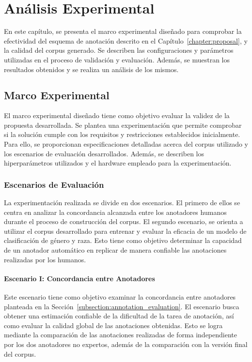 \chapter{An\'alisis Experimental}\label{chapter:implementation}
En este cap\'itulo, se presenta el marco experimental dise\~nado para comprobar la efectividad del esquema de anotaci\'on 
descrito en el Cap\'itulo~\ref{chapter:proposal}, y la calidad del corpus generado. Se describen las configuraciones y 
par\'ametros utilizadas en el proceso de validaci\'on y evaluaci\'on. Adem\'as, se muestran los resultados obtenidos y 
se realiza un an\'alisis de los mismos.

\section{Marco Experimental}\label{section:experimental_framework}
El marco experimental dise\~nado tiene como objetivo evaluar la validez de la propuesta desarrollada. Se plantea 
una experimentaci\'on que permite comprobar si la soluci\'on cumple con los requisitos y restricciones establecidos inicialmente.
Para ello, se proporcionan especificaciones detalladas acerca del corpus utilizado y los escenarios de evaluaci\'on desarrollados.
Adem\'as, se describen los hiperpar\'ametros utilizados y el hardware empleado para la experimentaci\'on.

\subsection{Escenarios de Evaluaci\'on}
La experimentaci\'on realizada se divide en dos escenarios. El primero de ellos se centra en analizar la concordancia alcanzada entre 
los anotadores humanos durante el proceso de construcci\'on del corpus. El segundo escenario, se orienta a utilizar el corpus 
desarrollado para entrenar y evaluar la eficacia de un modelo de clasificaci\'on de g\'enero y raza. Esto tiene como objetivo determinar
la capacidad de un anotador autom\'atico en replicar de manera confiable las anotaciones realizadas por los humanos. 

\subsubsection{Escenario I: Concordancia entre Anotadores}\label{subsection:scenery1}
Este escenario tiene como objetivo examinar la concordancia entre anotadores planteada en la 
Secci\'on~\ref{subsection:annotation_evaluation}. El escenario busca obtener una estimaci\'on confiable de la dificultad de la 
tarea de anotaci\'on, as\'i como evaluar la calidad global de las anotaciones obtenidas. Esto se logra mediante la comparaci\'on
de las anotaciones realizadas de forma independiente por los dos anotadores no expertos, adem\'as de la comparaci\'on con la 
versi\'on final del corpus.

